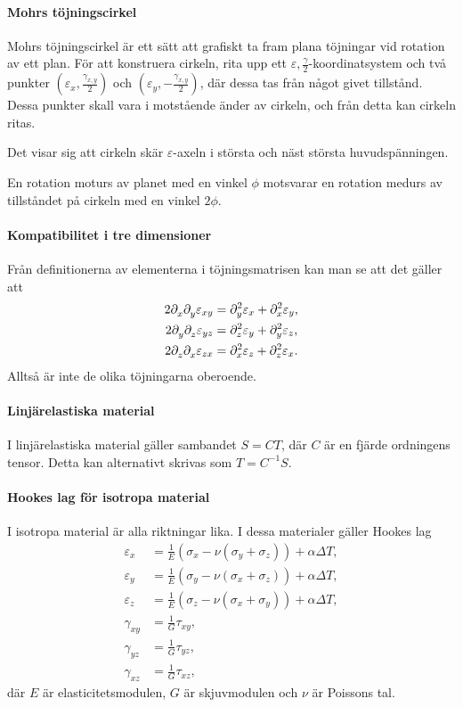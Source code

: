 \paragraph{Mohrs töjningscirkel}
Mohrs töjningscirkel är ett sätt att grafiskt ta fram plana töjningar vid rotation av ett plan. För att konstruera cirkeln, rita upp ett $\varepsilon, \frac{\gamma}{2}$-koordinatsystem och två punkter $(\varepsilon_{x}, \frac{\gamma_{x, y}}{2})$ och $(\varepsilon_{y}, -\frac{\gamma_{x, y}}{2})$, där dessa tas från något givet tillstånd. Dessa punkter skall vara i motstående änder av cirkeln, och från detta kan cirkeln ritas. 

Det visar sig att cirkeln skär $\varepsilon$-axeln i största och näst största huvudspänningen.

En rotation moturs av planet med en vinkel $\phi$ motsvarar en rotation medurs av tillståndet på cirkeln med en vinkel $2\phi$.

\paragraph{Kompatibilitet i tre dimensioner}
Från definitionerna av elementerna i töjningsmatrisen kan man se att det gäller att
\begin{align*}
	2\del{x}{\del{y}{\varepsilon_{xy}}} &= \del[2]{y}{\varepsilon_{x}} + \del[2]{x}{\varepsilon_{y}}, \\
	2\del{y}{\del{z}{\varepsilon_{yz}}} &= \del[2]{z}{\varepsilon_{y}} + \del[2]{y}{\varepsilon_{z}}, \\
	2\del{z}{\del{x}{\varepsilon_{zx}}} &= \del[2]{x}{\varepsilon_{z}} + \del[2]{z}{\varepsilon_{x}}.
\end{align*}
Alltså är inte de olika töjningarna oberoende.

\paragraph{Linjärelastiska material}
I linjärelastiska material gäller sambandet $S = CT$, där $C$ är en fjärde ordningens tensor. Detta kan alternativt skrivas som $T = C^{-1}S$.

\paragraph{Hookes lag för isotropa material}
I isotropa material är alla riktningar lika. I dessa materialer gäller Hookes lag
\begin{align*}
	\varepsilon_{x} &= \frac{1}{E}(\sigma_{x} - \nu(\sigma_{y} + \sigma_{z})) + \alpha\Delta T, \\
	\varepsilon_{y} &= \frac{1}{E}(\sigma_{y} - \nu(\sigma_{x} + \sigma_{z})) + \alpha\Delta T, \\
	\varepsilon_{z} &= \frac{1}{E}(\sigma_{z} - \nu(\sigma_{x} + \sigma_{y})) + \alpha\Delta T, \\
	\gamma_{xy}     &= \frac{1}{G}\tau_{xy}, \\
	\gamma_{yz}     &= \frac{1}{G}\tau_{yz}, \\
	\gamma_{xz}     &= \frac{1}{G}\tau_{xz},
\end{align*}
där $E$ är elasticitetsmodulen, $G$ är skjuvmodulen och $\nu$ är Poissons tal.

